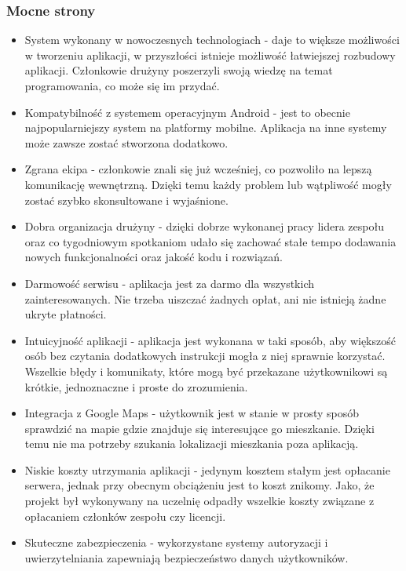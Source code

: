 \documentclass[polish, 11pt]{article}
\begin{document}
        \subsubsection{Mocne strony}
            \begin{itemize}
                \item System wykonany w nowoczesnych technologiach - daje to większe możliwości w tworzeniu aplikacji, w przyszłości istnieje możliwość łatwiejszej rozbudowy aplikacji. Członkowie drużyny poszerzyli swoją wiedzę na temat programowania, co może się im przydać.
                \item Kompatybilność z systemem operacyjnym Android - jest to obecnie najpopularniejszy system na platformy mobilne. Aplikacja na inne systemy może zawsze zostać stworzona dodatkowo.
                \item Zgrana ekipa - członkowie znali się już wcześniej, co pozwoliło na lepszą komunikację wewnętrzną. Dzięki temu każdy problem lub wątpliwość mogły zostać szybko skonsultowane i wyjaśnione.
                \item Dobra organizacja drużyny - dzięki dobrze wykonanej pracy lidera zespołu oraz co tygodniowym spotkaniom udało się zachować stałe tempo dodawania nowych funkcjonalności oraz jakość kodu i rozwiązań.
                \item Darmowość serwisu - aplikacja jest za darmo dla wszystkich zainteresowanych. Nie trzeba uiszczać żadnych opłat, ani nie istnieją żadne ukryte płatności.
                \item Intuicyjność aplikacji - aplikacja jest wykonana w taki sposób, aby większość osób bez czytania dodatkowych instrukcji mogła z niej sprawnie korzystać. Wszelkie błędy i komunikaty, które mogą być przekazane użytkownikowi są krótkie, jednoznaczne i proste do zrozumienia.
                \item Integracja z Google Maps - użytkownik jest w stanie w prosty sposób sprawdzić na mapie gdzie znajduje się interesujące go mieszkanie. Dzięki temu nie ma potrzeby szukania lokalizacji mieszkania poza aplikacją.
                \item Niskie koszty utrzymania aplikacji - jedynym kosztem stałym jest opłacanie serwera, jednak przy obecnym obciążeniu jest to koszt znikomy. Jako, że projekt był wykonywany na uczelnię odpadły wszelkie koszty związane z opłacaniem członków zespołu czy licencji. 
                \item Skuteczne zabezpieczenia - wykorzystane systemy autoryzacji i uwierzytelniania zapewniają bezpieczeństwo danych użytkowników.
            \end{itemize}
        
\end{document}
